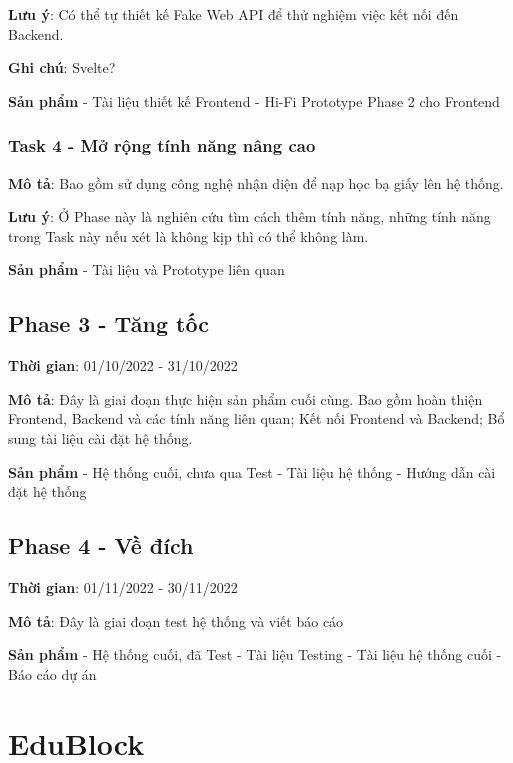 \documentclass[
  letterpaper,
  DIV=11,
  numbers=noendperiod]{scrreprt}
\begin{document}
\textbf{Lưu ý}: Có thể tự thiết kế Fake Web API để thử nghiệm việc kết
nối đến Backend.

\textbf{Ghi chú}: Svelte?

\textbf{Sản phẩm} - Tài liệu thiết kế Frontend - Hi-Fi Prototype Phase 2
cho Frontend

\hypertarget{task-4---mux1edf-rux1ed9ng-tuxednh-nux103ng-nuxe2ng-cao}{%
\subsection{Task 4 - Mở rộng tính năng nâng
cao}\label{task-4---mux1edf-rux1ed9ng-tuxednh-nux103ng-nuxe2ng-cao}}

\textbf{Mô tả}: Bao gồm sử dụng công nghệ nhận diện để nạp học bạ giấy
lên hệ thống.

\textbf{Lưu ý}: Ở Phase này là nghiên cứu tìm cách thêm tính năng, những
tính năng trong Task này nếu xét là không kịp thì có thể không làm.

\textbf{Sản phẩm} - Tài liệu và Prototype liên quan

\hypertarget{phase-3---tux103ng-tux1ed1c}{%
\section{Phase 3 - Tăng tốc}\label{phase-3---tux103ng-tux1ed1c}}

\textbf{Thời gian}: 01/10/2022 - 31/10/2022

\textbf{Mô tả}: Đây là giai đoạn thực hiện sản phẩm cuối cùng. Bao gồm
hoàn thiện Frontend, Backend và các tính năng liên quan; Kết nối
Frontend và Backend; Bổ sung tài liệu cài đặt hệ thống.

\textbf{Sản phẩm} - Hệ thống cuối, chưa qua Test - Tài liệu hệ thống -
Hướng dẫn cài đặt hệ thống

\hypertarget{phase-4---vux1ec1-ux111uxedch}{%
\section{Phase 4 - Về đích}\label{phase-4---vux1ec1-ux111uxedch}}

\textbf{Thời gian}: 01/11/2022 - 30/11/2022

\textbf{Mô tả}: Đây là giai đoạn test hệ thống và viết báo cáo

\textbf{Sản phẩm} - Hệ thống cuối, đã Test - Tài liệu Testing - Tài liệu
hệ thống cuối - Báo cáo dự án


\hypertarget{edublock}{%
\chapter{EduBlock}\label{edublock}}
\end{document}
